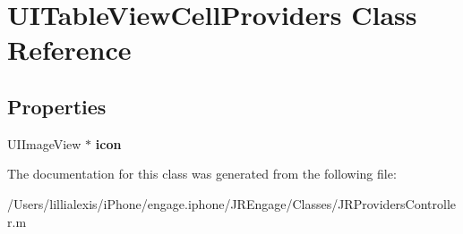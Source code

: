 \hypertarget{interface_u_i_table_view_cell_providers}{
\section{UITableViewCellProviders Class Reference}
\label{interface_u_i_table_view_cell_providers}
}
\subsection*{Properties}
\begin{DoxyCompactItemize}
\item 
\hypertarget{interface_u_i_table_view_cell_providers_a6e6edde9fc19990f4a975223531fe57a}{
UIImageView $\ast$ {\bfseries icon}}
\label{interface_u_i_table_view_cell_providers_a6e6edde9fc19990f4a975223531fe57a}

\end{DoxyCompactItemize}


The documentation for this class was generated from the following file:\begin{DoxyCompactItemize}
\item 
/Users/lillialexis/iPhone/engage.iphone/JREngage/Classes/JRProvidersController.m\end{DoxyCompactItemize}
